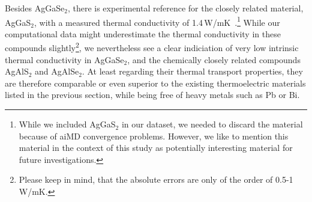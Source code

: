 Besides AgGaSe$_2$, there is experimental reference for the closely related material, AgGaS$_2$, with a measured thermal conductivity of 1.4\,W/mK~\cite{beasley1994}.\footnote{While we included AgGaS$_2$ in our dataset, we needed to discard the material because of aiMD convergence problems. However, we like to mention this material in the context of this study as potentially interesting material for future investigations.} While our computational data might underestimate the thermal conductivity in these compounds slightly\footnote{Please keep in mind, that the absolute errors are only of the order of 0.5-1\,W/mK.}, we nevertheless see a clear indiciation of very low intrinsic thermal conductivity in AgGaSe$_2$, and the chemically closely related compounds AgAlS$_2$ and AgAlSe$_2$. At least regarding their thermal transport properties, they are therefore comparable or even superior to the existing thermoelectric materials listed in the previous section, while being free of heavy metals such as Pb or Bi.

